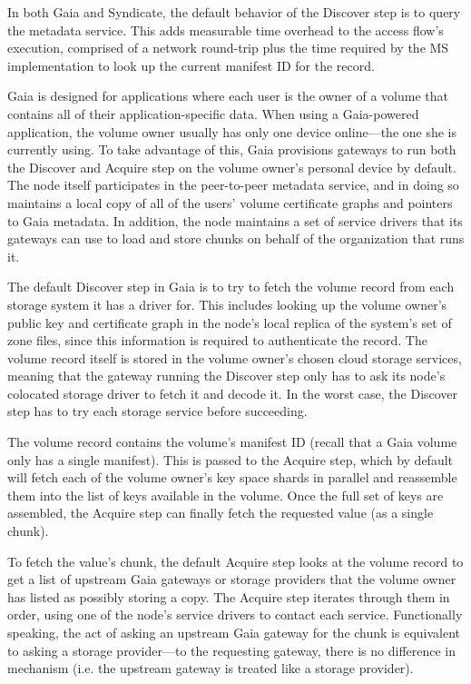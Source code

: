 In both Gaia and Syndicate, the default behavior of the Discover step is to query the
metadata service.  This adds measurable time overhead to the access flow's
execution, comprised of a network round-trip plus the time required by the MS
implementation to look up the current manifest ID for the record.

Gaia is designed for applications where each user is the owner of a volume that
contains all of their application-specific data.
When using a Gaia-powered application, the volume owner usually
has only one device online---the one she is
currently using.  To take advantage of this, Gaia provisions gateways to run 
both the Discover and Acquire step on the volume owner's personal device by
default.  The node itself participates in the peer-to-peer metadata service,
and in doing so maintains a local copy
of all of the users' volume certificate graphs and pointers to Gaia metadata.
In addition, the node maintains a set of service drivers that its gateways can use to load and store
chunks on behalf of the organization that runs it.

The default Discover step in Gaia is to try to fetch the volume record from each
storage system it has a driver for.  This includes
looking up the volume owner's public key and 
certificate graph in the node's local replica of
the system's set of zone files, since this information is required to
authenticate the record.  The volume record itself is stored in the volume
owner's chosen cloud storage services, meaning that the gateway running the
Discover step only has to ask its
node's colocated storage driver to fetch it and decode it.  In the worst case,
the Discover step has to try each storage service before succeeding.

The volume record contains the volume's manifest ID (recall that a Gaia volume
only has a single manifest).  This is passed to the Acquire step, which by
default will fetch each of the volume owner's key space shards in parallel and
reassemble them into the list of keys available in the volume.  Once the full
set of keys are assembled, the Acquire step can finally fetch the requested
value (as a single chunk).

To fetch the value's chunk, the default Acquire step looks at the volume record
to get a list of upstream Gaia gateways or storage providers that the volume
owner has listed as possibly storing a copy.  The Acquire step iterates through
them in order, using one of the node's service drivers to contact each service.
Functionally speaking, the act of asking an upstream Gaia gateway for the chunk is 
equivalent to asking a storage provider---to the requesting
gateway, there is no difference in mechanism (i.e. the upstream gateway is
treated like a storage provider).

